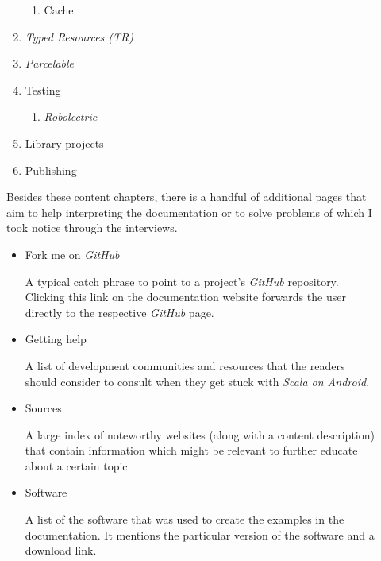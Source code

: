 \begin{description}
\begin{enumerate}
\begin{enumerate}
			\item Cache

		\end{enumerate}

		\item \textit{Typed Resources (TR)}

		\item \textit{Parcelable}

		\item Testing

		\begin{enumerate}

			\item \textit{Robolectric}

		\end{enumerate}

		\item Library projects

		\item Publishing

	\end{enumerate}

	Besides these content chapters, there is a handful of additional pages that aim to help interpreting the documentation or to solve problems of which I took notice through the interviews.

	\begin{itemize}

		\item Fork me on \textit{GitHub}

		A typical catch phrase to point to a project's \textit{GitHub} repository. Clicking this link on the documentation website forwards the user directly to the respective \textit{GitHub} page.

		\item Getting help

		A list of development communities and resources that the readers should consider to consult when they get stuck with \textit{Scala on Android}.

		\item Sources

		A large index of noteworthy websites (along with a content description) that contain information which might be relevant to further educate about a certain topic.

		\item Software

		A list of the software that was used to create the examples in the documentation. It mentions the particular version of the software and a download link.


\end{itemize}
\end{description}
